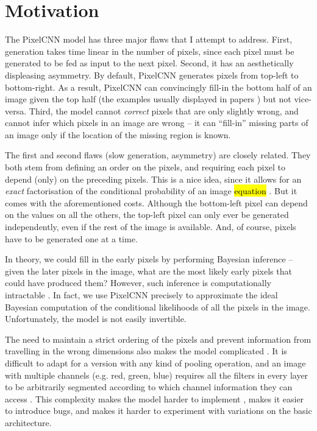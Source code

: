 \documentclass[10pt,a4paper]{article}
\newcommand{\nquote}[1]{``{#1}''}
\begin{document}
\section{Motivation}

The PixelCNN model has three major flaws that I attempt to address. First, generation takes time linear in the number of pixels, since each pixel must be generated to be fed as input to the next pixel. Second, it has an aesthetically displeasing asymmetry. By default, PixelCNN generates pixels from top-left to bottom-right. As a result, PixelCNN can convincingly fill-in the bottom half of an image given the top half (the examples usually displayed in papers \cite{pixelcnn1,??,??}) but not vice-versa. Third, the model cannot \emph{correct} pixels that are only slightly wrong, and cannot infer which pixels in an image are wrong -- it can \nquote{fill-in} missing parts of an image only if the location of the missing region is known.

The first and second flaws (slow generation, asymmetry) are closely related. They both stem from defining an order on the pixels, and requiring each pixel to depend (only) on the preceding pixels. This is a nice idea, since it allows for an \emph{exact} factorisation of the conditional probability of an image \hl{equation} \cite{pixelcnn1}. But it comes with the aforementioned costs. Although the bottom-left pixel can depend on the values on all the others, the top-left pixel can only ever be generated independently, even if the rest of the image is available. And, of course, pixels have to be generated one at a time.

In theory, we could fill in the early pixels by performing Bayesian inference \cite{??} -- given the later pixels in the image, what are the most likely early pixels that could have produced them? However, such inference is computationally intractable \cite{??}. In fact, we use PixelCNN precisely to approximate the ideal Bayesian computation of the conditional likelihoods of all the pixels in the image. Unfortunately, the model is not easily invertible.

The need to maintain a strict ordering of the pixels and prevent information from travelling in the wrong dimensions also makes the model complicated \cite{??}. It is difficult to adapt for a version with any kind of pooling operation, and an image with multiple channels (e.g. red, green, blue) requires all the filters in every layer to be arbitrarily segmented according to which channel information they can access \cite{??}. This complexity makes the model harder to implement \cite{??}, makes it easier to introduce bugs, and makes it harder to experiment with variations on the basic architecture.
\end{document}
